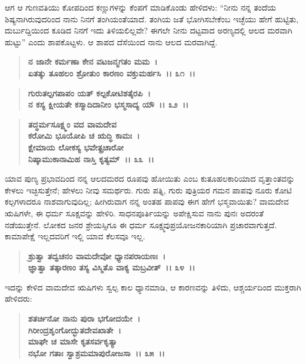 ಆಗ ಆ ಗುಣವತಿಯು ಕೋಪದಿಂದ ಕಣ್ಣುಗಳನ್ನು ಕೆಂಪಗೆ ಮಾಡಿಕೊಂಡು ಹೇಳಿದಳು: “ನೀನು ನನ್ನ ತಂದೆಯ ಶಿಷ್ಯನಾಗಿರುವುದರಿಂದ ನಾನು ನಿನಗೆ ತಂಗಿಯಂತೆಯಾದೆ. ತಂಗಿಯ ಜತೆ ಭೋಗಿಸಬೇಕೆಂಬ ಇಚ್ಛೆಯು ಹೇಗೆ ಹುಟ್ಟಿತು, ದುರ್ಬುದ್ದಿಯಿಂದ ಕೂಡಿದ ನಿನಗೆ ಇದು ತಿಳಿಯಲಿಲ್ಲವೇ? ಈಗಲೇ ನೀನು ದಟ್ಟವಾದ ಅರಣ್ಯದಲ್ಲಿ ಆಲದ ಮರವಾಗಿ ಹುಟ್ಟು” ಎಂದು ಶಾಪಕೊಟ್ಟಳು. ಆ ಶಾಪದ ದೆಸೆಯಿಂದ ನಾನು ಆಲದ ಮರವಾಗಿದ್ದೆ.

\begin{verse}
\textbf{ನ ಜಾನೇ ಕರ್ಮಣಾ ಕೇನ ವಟಜನ್ಮಗತಂ ಮಮ~।}\\\textbf{ಏತತ್ಕು ತೂಹಲಂ ಶ್ರೋತುಂ ಕಾರಣಂ ವಕ್ತುಮರ್ಹಸಿ~।। ೩೧~।।} 
\end{verse}

\begin{verse}
\textbf{ಗುರುತಲ್ಪಗಪಾಪಂ ಯತ್ ಕಲ್ಪಕೋಟಿಶತೈರಪಿ~।}\\\textbf{ನ ಕಸ್ಯ ಕ್ಷೀಯತೇ ಕಸ್ಮಾದಿದಾನೀಂ ಭಸ್ಮಸಾದ್ಯ ಯೌ~।। ೩೨~।। }
\end{verse}

\begin{verse}
\textbf{ತದ್ಧರ್ಮಸೂಕ್ಷ್ಮಂ ವದ ವಾಮದೇವ}\\\textbf{ಕರೋಮಿ ಭೂಯೋಪಿ ಚ ಋದ್ಧಿ ಕಾಮಃ~। }\\\textbf{ಕ್ಷೇಮಾಯ ಲೋಕಸ್ಯ ಭವೇತ್ಪ್ರಚಾರೋ} \\\textbf{ನಿಷ್ಕಾಮುಕಾನಾಮಿಹ ನಾಸ್ತಿ ಕೃತ್ಯಮ್~।। ೩೩~।।}
\end{verse}

ಯಾವ ಪುಣ್ಯ ಪ್ರಭಾವದಿಂದ ನನ್ನ ಆಲದಮರದ ರೂಪವು ಹೋಯಿತು ಎಂಬ ಕುತೂಹಲಕಾರಿಯಾದ ವೃತ್ತಾಂತವನ್ನು ಕೇಳಲು ಇಚ್ಛಿಸುತ್ತೇನೆ; ಹೇಳಲು ನೀವು ಸಮರ್ಥರು. ಗುರು ಪತ್ನಿ, ಗುರು ಪುತ್ರಿಯರ ಗಮನ ಪಾಪವು ನೂರು ಕೋಟಿ ಕಲ್ಪಗಳಾದರೂ ನಾಶವಾಗುವುದಿಲ್ಲ; ಹೀಗಿರುವಾಗ ನನ್ನ ಅಂತಹ ಪಾಪವು ಈಗ ಹೇಗೆ ಭಸ್ಮವಾಯಿತು? ವಾಮದೇವ ಋಷಿಗಳೇ, ಈ ಧರ್ಮ ಸೂಕ್ಷವನ್ನು ಹೇಳಿರಿ. ಸಾಧನಪೂರ್ತಿಯನ್ನು ಅಪೇಕ್ಷಿಸುವ ನಾನು ಪುನಃ ಅದರಂತೆ ನಡೆಯುತ್ತೇನೆ. ಲೋಕದ ಜನರ ಶ್ರೇಯಸ್ಸಿಗೂ ಈ ಧರ್ಮ ಸೂಕ್ಷ್ಮವು\break ಪ್ರಯೋಜನಕಾರಿಯಾಗಿ ಪ್ರಚಾರವಾಗುತ್ತದೆ. ಕಾಮಾಪೇಕ್ಷೆ ಇಲ್ಲದವರಿಗೆ ಇಲ್ಲಿ ಯಾವ ಕೆಲಸವೂ ಇಲ್ಲ.

\begin{verse}
\textbf{ಶ್ರುತ್ವಾ ತದ್ವಚನಂ ವಾಮದೇವೋ ಧ್ಯಾನಪರಾಯಣಃ~।}\\\textbf{ಜ್ಞಾತ್ವಾ ತತ್ಕಾರಣಂ ತಸ್ಯ ವಿಸ್ಮಿತೊ ವಾಕ್ಯ ಮಬ್ರವೀತ್~।। ೩೪~।।}
\end{verse}

ಇದನ್ನು ಕೇಳಿದ ವಾಮದೇವ ಋಷಿಗಳು ಸ್ವಲ್ಪ ಕಾಲ ಧ್ಯಾನಮಾಡಿ, ಆ ಕಾರಣವನ್ನು ತಿಳಿದು, ಆಶ್ಚರ್ಯದಿಂದ ಮುಕ್ತರಾಗಿ ಹೇಳಿದರು:

\begin{verse}
\textbf{ಶತರ್ಚಿನೋ ನಾನು ಪುರಾ ಭಗೋದಯೇ~।}\\\textbf{ಗಿರೀಂದ್ರಶೃಂಗೋದ್ಭುತದೇವಖಾತೇ~। }\\\textbf{ಮಾಘೇ ಚ ಮಾಸೇ ಕೃತಸರ್ವಕೃತ್ಯಾ} \\\textbf{ನಭೋ ಗತಾಃ ಸ್ವಾಶ್ರಮಮಾಪುರೋಜಸಾ~।। ೩೫~।। }
\end{verse}

